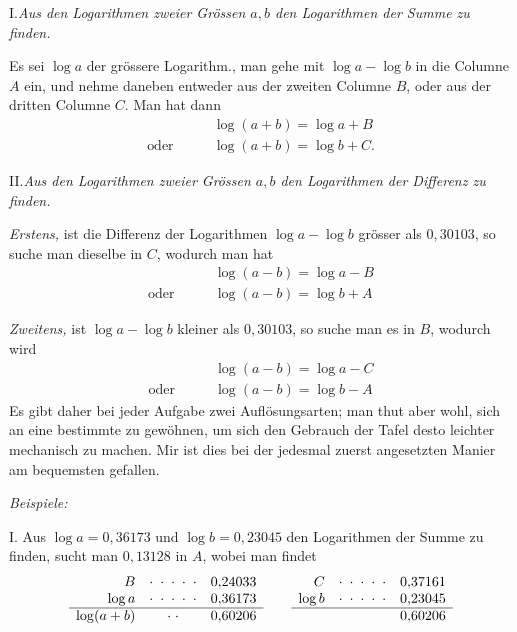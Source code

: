 \begin{center}
I.\quad \emph{Aus den Logarithmen zweier Grössen \(a,b\) den Logarithmen der Summe
zu finden.}
\end{center}

Es sei \(\log a\) der grössere Logarithm., man gehe mit \(\log a-\log b\) in die
Columne \(A\) ein, und nehme daneben entweder aus der zweiten Columne \(B\), oder
aus der dritten Columne \(C\). Man hat dann
\[
\begin{aligned}
&\log(a+b)=\log a+B\\
\text{oder}\qquad &\log(a+b)=\log b+C.
\end{aligned}
\]

\begin{center}
II.\quad \emph{Aus den Logarithmen zweier Grössen \(a,b\) den Logarithmen der Differenz
zu finden.}
\end{center}

\emph{Erstens,} ist die Differenz der Logarithmen \(\log a-\log b\) grösser als \(0,30103\),
so suche man dieselbe in \(C\), wodurch man hat
\[
\begin{aligned}
&\log(a-b)=\log a-B\\
\text{oder}\qquad &\log(a-b)=\log b+A
\end{aligned}
\]

\emph{Zweitens,} ist \(\log a-\log b\) kleiner als \(0,30103\), so suche man es in \(B\), wodurch wird
\[
\begin{aligned}
&\log(a-b)=\log a-C\\
\text{oder}\qquad &\log(a-b)=\log b-A
\end{aligned}
\]
Es gibt daher bei jeder Aufgabe zwei Auflösungsarten; man thut aber wohl,
sich an eine bestimmte zu gewöhnen, um sich den Gebrauch der Tafel desto leichter mechanisch zu machen. Mir ist dies bei der jedesmal zuerst angesetzten Manier am bequemsten gefallen.

\begin{center}\textit{Beispiele:}\end{center}

I. Aus $\log a=0{,}36173$ und $\log b=0{,}23045$ den Logarithmen der Summe
zu finden, sucht man $0{,}13128$ in $A$, wobei man findet
\[
\begin{array}{rcr}
B&\cdot\;\cdot\;\cdot\;\cdot\;\cdot&0{,}24033\\
\log a&\cdot\;\cdot\;\cdot\;\cdot\;\cdot&0{,}36173\\\hline
\log(a+b)&\cdot\;\cdot&0{,}60206
\end{array}
\qquad
\begin{array}{rcr}
C&\cdot\;\cdot\;\cdot\;\cdot\;\cdot&0{,}37161\\
\log b&\cdot\;\cdot\;\cdot\;\cdot\;\cdot&0{,}23045\\\hline
&&0{,}60206
\end{array}
\]

